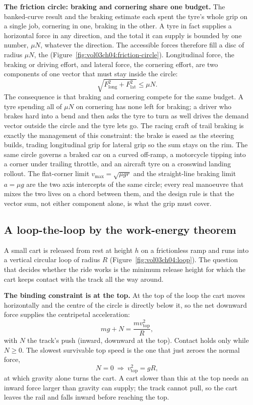 \begin{mastery}
\textbf{The friction circle: braking and cornering share one budget.}
The banked-curve result and the braking estimate each spent the tyre's
whole grip on a single job, cornering in one, braking in the other. A
tyre in fact supplies a horizontal force in any direction, and the total
it can supply is bounded by one number, $\mu N$, whatever the direction.
The accessible forces therefore fill a disc of radius $\mu N$, the
 (Figure~\ref{fig:vol03ch04:friction-circle}).
Longitudinal force, the braking or driving effort, and lateral force,
the cornering effort, are two components of one vector that must stay
inside the circle:
\[
\sqrt{F_{\text{long}}^{2}+F_{\text{lat}}^{2}}\le\mu N.
\]
The consequence is that braking and cornering compete for the same
budget. A tyre spending all of $\mu N$ on cornering has none left for
braking; a driver who brakes hard into a bend and then asks the tyre to
turn as well drives the demand vector outside the circle and the tyre
lets go. The racing craft of trail braking is exactly the management of
this constraint: the brake is eased as the steering builds, trading
longitudinal grip for lateral grip so the sum stays on the rim. The
same circle governs a braked car on a curved off-ramp, a motorcycle
tipping into a corner under trailing throttle, and an aircraft tyre on a
crosswind landing rollout. The flat-corner limit $v_{\max}=\sqrt{\mu g
r}$ and the straight-line braking limit $a=\mu g$ are the two axis
intercepts of the same circle; every real manoeuvre that mixes the two
lives on a chord between them, and the design rule is that the vector
sum, not either component alone, is what the grip must cover.
\end{mastery}



\subsection{A loop-the-loop by the work-energy theorem}

A small cart is released from rest at height $h$ on a frictionless
ramp and runs into a vertical circular loop of radius $R$
(Figure~\ref{fig:vol03ch04:loop}). The question that decides whether
the ride works is the minimum release height for which the cart keeps
contact with the track all the way around.

\textbf{The binding constraint is at the top.} At the top of the loop
the cart moves horizontally and the centre of the circle is directly
below it, so the net downward force supplies the centripetal
acceleration:
\[
mg + N = \frac{m v_{\text{top}}^{2}}{R},
\]
with $N$ the track's push (inward, downward at the top). Contact holds
only while $N\ge 0$. The slowest survivable top speed is the one that
just zeroes the normal force,
\[
N=0 \ \Rightarrow\ v_{\text{top}}^{2}=gR,
\]
at which gravity alone turns the cart. A cart slower than this at the
top needs an inward force larger than gravity can supply; the track
cannot pull, so the cart leaves the rail and falls inward before
reaching the top.

